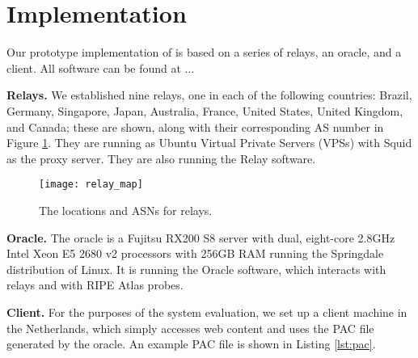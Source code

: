 \section{Implementation}
Our prototype implementation of \system{} is based on a series of relays, an oracle, and 
a client. All \system{} software can be found at ... 

{\bf Relays.}  We established nine relays, one in each of the following countries: Brazil, 
Germany, Singapore, Japan, Australia, France, United States, United Kingdom, and Canada; these 
are shown, along with their corresponding AS number in Figure \ref{fig:relay_locations}.  
They are running as Ubuntu Virtual Private Servers (VPSs) with 
Squid as the proxy server.  They are also running the \system{} Relay software.

\begin{figure}[b!]
\centering
\texttt{[image: relay\_map]}
\caption{The locations and ASNs for \system{} relays.}
\label{fig:relay_locations}
\end{figure}

{\bf Oracle.}  The oracle is a Fujitsu RX200 S8 server with dual, 
eight-core 2.8GHz Intel Xeon E5 2680 v2 processors with 256GB RAM running the 
Springdale distribution of Linux. It is running the \system{} Oracle software, 
which interacts with relays and with RIPE Atlas probes.

{\bf Client.} For the purposes of the system evaluation, we set up a client 
machine in the Netherlands, which simply accesses web content and uses the PAC 
file generated by the oracle.  An example PAC file is shown in Listing \ref{lst:pac}.


